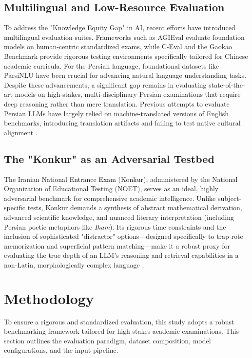 \documentclass[twoside]{article}
\begin{document}
\subsection{Multilingual and Low-Resource Evaluation}
To address the "Knowledge Equity Gap" in AI, recent efforts have introduced multilingual evaluation suites. Frameworks such as AGIEval \cite{Zhong:2023} evaluate foundation models on human-centric standardized exams, while C-Eval \cite{Huang:2023} and the Gaokao Benchmark \cite{Zhang:2023} provide rigorous testing environments specifically tailored for Chinese academic curricula. For the Persian language, foundational datasets like ParsiNLU \cite{Khashabi:2021} have been crucial for advancing natural language understanding tasks. Despite these advancements, a significant gap remains in evaluating state-of-the-art models on high-stakes, multi-disciplinary Persian examinations that require deep reasoning rather than mere translation. Previous attempts to evaluate Persian LLMs have largely relied on machine-translated versions of English benchmarks, introducing translation artifacts and failing to test native cultural alignment \cite{Lai:2023}.

\subsection{The "Konkur" as an Adversarial Testbed}
The Iranian National Entrance Exam (Konkur), administered by the National Organization of Educational Testing (NOET), serves as an ideal, highly adversarial benchmark for comprehensive academic intelligence. Unlike subject-specific tests, Konkur demands a synthesis of abstract mathematical derivation, advanced scientific knowledge, and nuanced literary interpretation (including Persian poetic metaphors like \textit{Iham}). Its rigorous time constraints and the inclusion of sophisticated "distractor" options—designed specifically to trap rote memorization and superficial pattern matching—make it a robust proxy for evaluating the true depth of an LLM's reasoning and retrieval capabilities in a non-Latin, morphologically complex language \cite{NOET:2025}.

\section{Methodology}
To ensure a rigorous and standardized evaluation, this study adopts a robust benchmarking framework tailored for high-stakes academic examinations. This section outlines the evaluation paradigm, dataset composition, model configurations, and the input pipeline.
\end{document}
